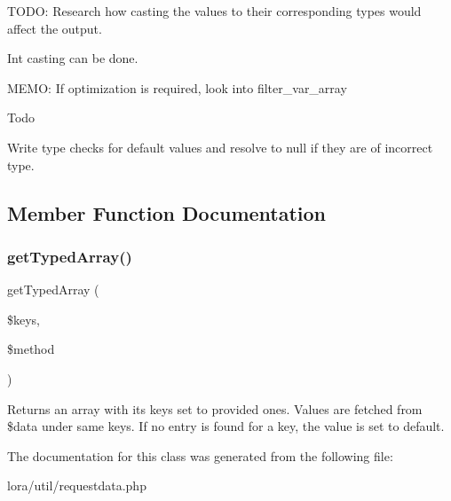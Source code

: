 T\+O\+DO\+: Research how casting the values to their corresponding types would affect the output.
\begin{DoxyItemize}
\item Int casting can be done.
\end{DoxyItemize}

M\+E\+MO\+: If optimization is required, look into filter\+\_\+var\+\_\+array



\begin{DoxyRefDesc}{Todo}
\item[\textbf{ Todo}]Write type checks for default values and resolve to null if they are of incorrect type. \end{DoxyRefDesc}


\subsection{Member Function Documentation}
\mbox{\label{class_request_data_aad8cc8d83c11936ce64f708392057942}} 
\subsubsection{get\+Typed\+Array()}
{\footnotesize\ttfamily get\+Typed\+Array (\begin{DoxyParamCaption}\item[{array}]{\$keys,  }\item[{string}]{\$method }\end{DoxyParamCaption})\hspace{0.3cm}{\ttfamily [private]}}

Returns an array with its keys set to provided ones. Values are fetched from \$data under same keys. If no entry is found for a key, the value is set to default. 


The documentation for this class was generated from the following file\+:\begin{DoxyCompactItemize}
\item 
lora/util/requestdata.\+php\end{DoxyCompactItemize}
